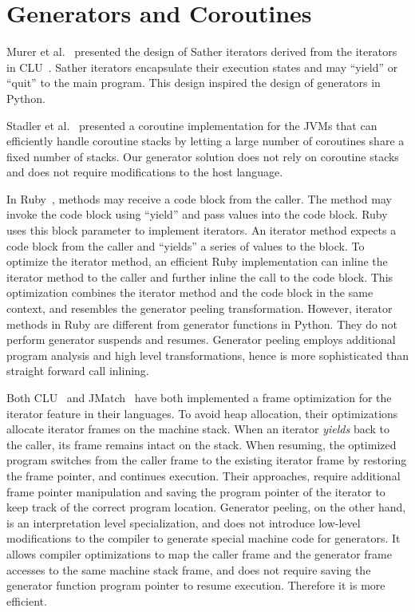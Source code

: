 \section{Generators and Coroutines}

Murer et al.~\cite{Murer1996} presented the design of Sather iterators derived from the iterators in CLU~\cite{Liskov1977}.
Sather iterators encapsulate their execution states and may ``yield'' or ``quit'' to the main program.
This design inspired the design of generators in Python.

Stadler et al.~\cite{Stadler2010} presented a coroutine implementation for the JVMs that can efficiently handle coroutine stacks by letting a large number of coroutines share a fixed number of stacks.
Our generator solution does not rely on coroutine stacks and does not require modifications to the host language.

In Ruby~\cite{ruby,sasada+yarv+2005,Furr+2009}, methods may receive a code block from the caller.
The method may invoke the code block using ``yield'' and pass values into the code block.
Ruby uses this block parameter to implement iterators.
An iterator method expects a code block from the caller and ``yields'' a series of values to the block.
To optimize the iterator method, an efficient Ruby implementation can inline the iterator method to the caller and further inline the call to the code block.
This optimization combines the iterator method and the code block in the same context, and resembles the generator peeling transformation.
However, iterator methods in Ruby are different from generator functions in Python.
They do not perform generator suspends and resumes.
Generator peeling employs additional program analysis and high level transformations, hence is more sophisticated than straight forward call inlining.

Both CLU~\cite{Atkinson1978CLU} and JMatch~\cite{Liu:2006JMatch} have both implemented a frame optimization for the iterator feature in their languages.
To avoid heap allocation, their optimizations allocate iterator frames on the machine stack.
When an iterator \emph{yields} back to the caller, its frame remains intact on the stack.
When resuming, the optimized program switches from the caller frame to the existing iterator frame by restoring the frame pointer, and continues execution.
Their approaches, require additional frame pointer manipulation and saving the program pointer of the iterator to keep track of the correct program location.
Generator peeling, on the other hand, is an interpretation level specialization, and does not introduce low-level modifications to the compiler to generate special machine code for generators.
It allows compiler optimizations to map the caller frame and the generator frame accesses to the same machine stack frame, and does not require saving the generator function program pointer to resume execution.
Therefore it is more efficient.

